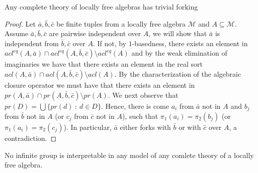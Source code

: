 \documentclass[a4paper,11pt]{article}
\begin{document}
%


\begin{theorem}
Any complete theory of locally free algebras has trivial forking
\end{theorem}
\begin{proof}
Let $\bar a, \bar b, \bar c$ be finite tuples from a locally free algebra $\mathcal{M}$ and $A\subseteq \mathcal{M}$. Assume $\bar a, \bar b , \bar c$ are pairwise independent over $A$, we will show that $\bar a$ is independent from $\bar b, \bar c$ over $A$. If not, by $1$-basedness, there exists an element in $acl^{eq}(A, \bar a)\cap acl^{eq}(A, \bar b, \bar c)\setminus acl^{eq}(A)$ and by the weak elimination of imaginaries we have that there exists an element in the real sort $acl(A, \bar a)\cap acl(A, \bar b, \bar c)\setminus acl(A)$. By the characterization of the algebraic closure operator we must have that there exists an element in  $pr(A,\bar a)\cap pr(A,\bar b, \bar c)\setminus pr(A)$. We next observe that $pr(D)=\bigcup\{pr(d) \ : \ d\in D\}$. Hence, there is come $a_i$ from $\bar a$ not in $A$ and $b_j$ from $\bar b$ not in $A$ (or $c_j$ from $\bar c$ not in $A$), such that $\pi_1(a_i)=\pi_2(b_j)$ (or $\pi_1(a_i)=\pi_2(c_j)$). In particular, $\bar a$ either forks with $\bar b$ or with $\bar c$ over $A$, a contradiction.   
\end{proof}

\begin{corollary}
No infinite group is interpretable in any model of any comlete theory of a locally free algebra. 
\end{corollary}
\end{document}
